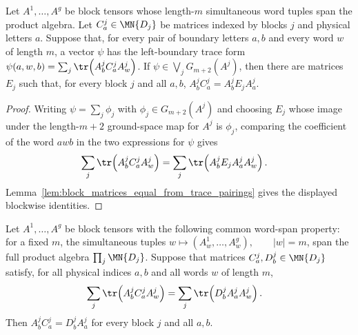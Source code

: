 \begin{lemma}
    \label{lem:blockwise_boundary_identities_from_left_trace_membership}
    \leanok
    Let $A^1,\ldots,A^g$ be block tensors whose length-$m$ simultaneous word
    tuples span the product algebra. Let $C^j_a\in \MN{D_j}$ be matrices
    indexed by blocks $j$ and physical letters $a$. Suppose that, for every
    pair of boundary letters $a,b$ and every word $w$ of length $m$, a vector
    $\psi$ has the left-boundary trace form
    $\psi(a,w,b) = \sum_j\tr\!\left(A^j_b C^j_a A^j_w\right)$.
    If $\psi\in\bigvee_j G_{m+2}(A^j)$, then there are matrices $E_j$ such
    that, for every block $j$ and all $a,b$,
    $A^j_bC^j_a = A^j_bE_jA^j_a$.
\end{lemma}

\begin{proof}
    \leanok
    Writing $\psi=\sum_j\phi_j$ with $\phi_j\in G_{m+2}(A^j)$ and choosing
    $E_j$ whose image under the length-$m+2$ ground-space map for
    $A^j$ is $\phi_j$, comparing the coefficient of the word $awb$ in the
    two expressions for $\psi$ gives
    \begin{align}
        \sum_j\tr\!\left(A^j_b C^j_a A^j_w\right)
         & =
        \sum_j\tr\!\left(A^j_bE_jA^j_aA^j_w\right).
        \notag
    \end{align}
    Lemma~\ref{lem:block_matrices_equal_from_trace_pairings} gives the
    displayed blockwise identities.
\end{proof}

\begin{lemma}
    \label{lem:blockwise_boundary_compatibility_from_traces}
    \leanok
    Let $A^1,\ldots,A^g$ be block tensors with the following common
    word-span property: for a fixed $m$, the simultaneous tuples
    $w \longmapsto \left(A^1_w,\ldots,A^g_w\right), \qquad |w|=m$,
    span the full product algebra $\prod_j \MN{D_j}$. Suppose that matrices
    $C^j_a,D^j_b\in \MN{D_j}$ satisfy, for all physical indices $a,b$ and
    all words $w$ of length $m$,
    \begin{align}
        \sum_j \tr\!\left(A^j_b C^j_a A^j_w\right)
         & =
        \sum_j \tr\!\left(D^j_b A^j_a A^j_w\right).
        \notag
    \end{align}
    Then
    $A^j_bC^j_a = D^j_bA^j_a$
    for every block $j$ and all $a,b$.
\end{lemma}

